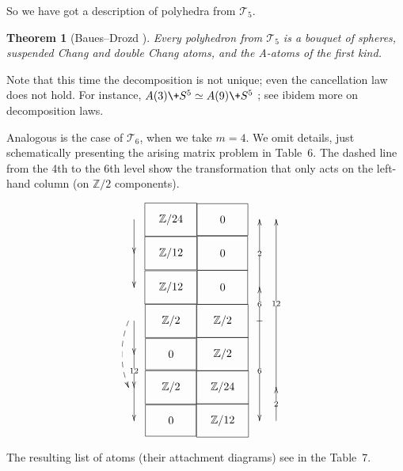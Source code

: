\documentclass[12pt,a4paper]{amsart}
\newtheorem{theorem}{Theorem}[section]
\theoremstyle{definition}
\theoremstyle{remark}
\numberwithin{equation}{section}
\begin{document}
   So we have got a description of polyhedra from ${\mathscr T}_5$.

 \begin{theorem}[Baues--Drozd \cite{bd1}]
   Every polyhedron from ${\mathscr T}_5$ is a bouquet of spheres, suspended
   Chang and double Chang atoms, and the A-atoms of the first kind.
 \end{theorem}

 Note that this time the decomposition is not unique; even the
 cancellation law does not hold. For instance,
 $A(3)\+S^5\simeq A(9)\+S^5$ \cite{bd1,d1}; see ibidem more on
 decomposition laws.

 Analogous is the case of ${\mathscr T}_6$, when we take $m=4$. We omit
 details, just schematically presenting the arising matrix problem in Table~6.
 The dashed line from the 4th to the 6th level show the transformation that
 only acts on the left-hand column (on ${\mathbb Z}/2$ components).
 \begin{table}[!htp]
   \caption{}\vspace*{-1.5em}
   \[
   \xymatrix@R=0em@C=0em {*=0{} \ar@<-1em>[d] &
   *+<2.5em,2em>[F]{{\mathbb Z}/24}&*+<3.4em,2.25em>[F]{\ 0\ } & *=0{} \\ 
              *=0{}\ar@<-1em>[d]&
   *+<2.5em,2em>[F]{{\mathbb Z}/12}&*+<3.35em,2.45em>[F]{\ 0\ } & *=0{} \\ 
                *=0{}       &
   *+<2.5em,2em>[F]{{\mathbb Z}/12}&*+<3.35em,2.45em>[F]{\ 0\ } &
   *=0{}\ar@<-1em>[uu]|2 \\ 
                *=0{}\ar@<-1em>[d] \ar@{-->}@/_/@<-1.5em>[dd]&
   *+<2.6em,2em>[F]{\,{\mathbb Z}/2\,}&*+<2.6em,2em>[F]{\,{\mathbb Z}/2\,} &
   *=0{}\ar@<-1em>[u]|6  \ar@<1em>@{|->}[ddd]|6\\ 
               *=0{}\ar@<-1em>[d]|{12}       &
   *+<3.4em,2.2em>[F]{\ 0\ }&*+<2.6em,2em>[F]{\,{\mathbb Z}/2\,} & *=0{}
         \\
                  *=0{}  \ar@<-1em>[d]      &
   *+<2.6em,2em>[F]{\,{\mathbb Z}/2\,}&*+<2.5em,2em>[F]{{\mathbb Z}/24} & *=0{}
   \ar@<-2.5em>[uuuuu]|{12} \\
                *=0{}       &
   *+<3.4em,2.2em>[F]{\ 0\ }&*+<2.5em,2em>[F]{{\mathbb Z}/12} & *=0{}
   	\ar@<-2.5em>[u]|2     }
  \]
 \end{table}
  The resulting list of atoms (their attachment diagrams) see in the Table~7.
 
\end{document}
